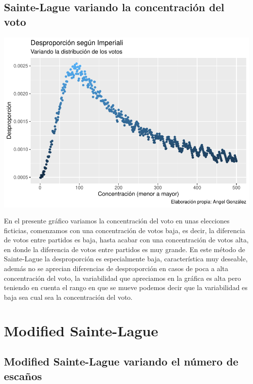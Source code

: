 \documentclass[12pt,a4paper,]{book}
\numberwithin{dummy}{section}
\theoremstyle{ocrenumbox}
\theoremstyle{blacknumex}
\theoremstyle{blacknumbox}
\theoremstyle{ocrenum}
\theoremstyle{ocrenum}
\begin{document}
\hypertarget{sainte-lague-variando-la-concentraciuxf3n-del-voto}{%
\subsection{Sainte-Lague variando la concentración del
voto}\label{sainte-lague-variando-la-concentraciuxf3n-del-voto}}

\begin{center}\includegraphics[width=0.95\linewidth]{figurasR/unnamed-chunk-23-1} \end{center}

En el presente gráfico variamos la concentración del voto en unas
elecciones ficticias, comenzamos con una concentración de votos baja, es
decir, la diferencia de votos entre partidos es baja, hasta acabar con
una concentración de votos alta, en donde la diferencia de votos entre
partidos es muy grande. En este método de Sainte-Lague la desproporción
es especialmente baja, característica muy deseable, además no se
aprecian diferencias de desproporción en casos de poca a alta
concentración del voto, la variabilidad que apreciamos en la gráfica es
alta pero teniendo en cuenta el rango en que se mueve podemos decir que
la variabilidad es baja sea cual sea la concentración del voto.

\hypertarget{modified-sainte-lague}{%
\section{Modified Sainte-Lague}\label{modified-sainte-lague}}

\hypertarget{modified-sainte-lague-variando-el-nuxfamero-de-escauxf1os}{%
\subsection{Modified Sainte-Lague variando el número de
escaños}\label{modified-sainte-lague-variando-el-nuxfamero-de-escauxf1os}}
\end{document}
